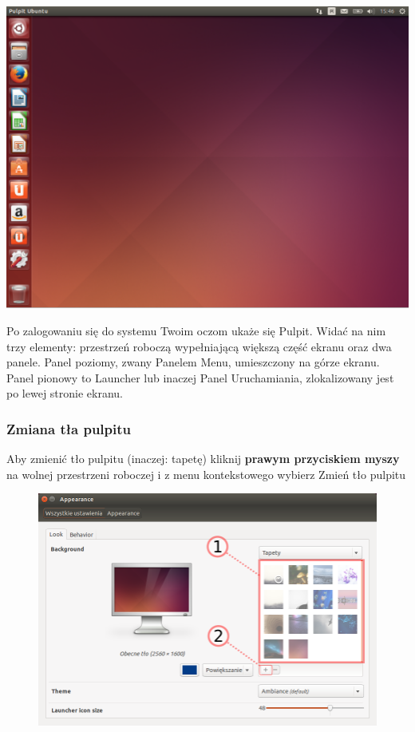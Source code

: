 \begin{center}
	\includegraphics[width=\linewidth]{images/unity_desktop.png}
\end{center}

Po zalogowaniu się do systemu Twoim oczom ukaże się Pulpit. Widać na nim trzy elementy: przestrzeń roboczą wypełniającą większą część ekranu oraz dwa panele. Panel poziomy, zwany \textcolor{ubuntu_orange}{Panelem Menu}, umieszczony na górze ekranu. Panel pionowy to \textcolor{ubuntu_orange}{Launcher} lub inaczej Panel Uruchamiania, zlokalizowany jest po lewej stronie ekranu.

\subsubsection{Zmiana tła pulpitu}
Aby zmienić tło pulpitu (inaczej: tapetę) kliknij \textbf{prawym przyciskiem myszy} na wolnej przestrzeni roboczej i z menu kontekstowego wybierz \textcolor{ubuntu_orange}{Zmień tło pulpitu}

\begin{figure}
	\vspace{-10pt}
	\includegraphics[width=\linewidth]{images/unity_zmiana_tapety.png}
\end{figure}

